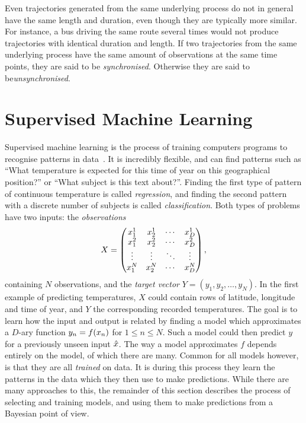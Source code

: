 Even trajectories generated from the same underlying process do not in general
have the same length and duration, even though they are typically more
similar. For instance, a bus driving the same route several times
would not produce trajectories with identical duration and length. 
If two trajectories from the same underlying
process have the same amount of observations at the same time points,
they are said to be \textit{synchronised}. 
Otherwise they are said to be\textit{unsynchronised}.

\section{Supervised Machine Learning}
Supervised machine learning is the process of training computers programs to
recognise patterns in data~\cite{Bishop-2006}. It is incredibly
flexible, and can find patterns such as ``What
temperature is expected for this time of year on this geographical
position?'' or ``What subject is this text about?''. Finding the first
type of pattern of continuous temperature is called
\textit{regression}, and finding the
second pattern with a discrete number of subjects is called
\textit{classification}. Both types of problems have two inputs: 
the \textit{observations}
\[X =
  \begin{pmatrix}
    x_{1}^{1} & x_{2}^{1} & \cdots & x_{D}^{1} \\
    x_{1}^{2} & x_{2}^{2} & \cdots & x_{D}^{2} \\
    \vdots  & \vdots  & \ddots & \vdots  \\
    x_{1}^{N} & x_{2}^{N} & \cdots & x_{D}^{N} \\
  \end{pmatrix},
\]
containing $N$ observations, and the \textit{target vector} $Y = (y_{1},
y_{2}, \dots, y_{N})$. In the first example of predicting temperatures,
$X$ could contain rows of latitude, longitude and time of year, and $Y$ the
corresponding recorded temperatures. The
goal is to learn how the input and output is related by finding a model which approximates a $D$-ary function $y_n =
f(x_n)$ for $1 \leq n \leq N$. Such a model could then
predict $y$ for a previously unseen input $\hat{x}$. The way a
model approximates $f$ depends entirely on the model, of which there
are many. Common for all models however, is that they are all \textit{trained}
on data. It is during this process they learn the patterns in the data
which they then use to make predictions.
While there are many approaches to this, the remainder of this
section describes the process of selecting and training models,
and using them to make predictions from a Bayesian point of view.

